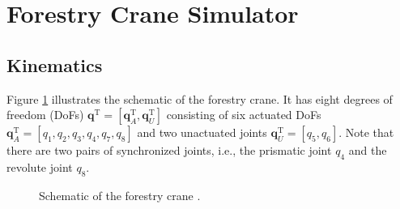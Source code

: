 \section{Forestry Crane Simulator} \label{Sec:method}

\subsection{Kinematics}

Figure \ref{fig:crane_scematics} illustrates the schematic of the forestry crane. 
It has eight degrees of freedom (DoFs) $\mathbf{q}^\mathrm{T} = [\mathbf{q}_A^\mathrm{T},\mathbf{q}_U^\mathrm{T}] $ consisting of six actuated DoFs $\mathbf{q}_A^\mathrm{T} = [q_1,q_2,q_3,q_4,q_7,q_8]$ and two unactuated joints $\mathbf{q}_U^\mathrm{T} = [{q}_5,{q}_6]$. Note that there are two pairs of synchronized joints, i.e., the prismatic joint $q_4$ and the revolute joint $q_8$. 

\begin{figure}
    \centering
    \caption{Schematic of the forestry crane \cite{ecker2022iterative}.}
    \label{fig:crane_scematics}
\end{figure}
\iffalse

